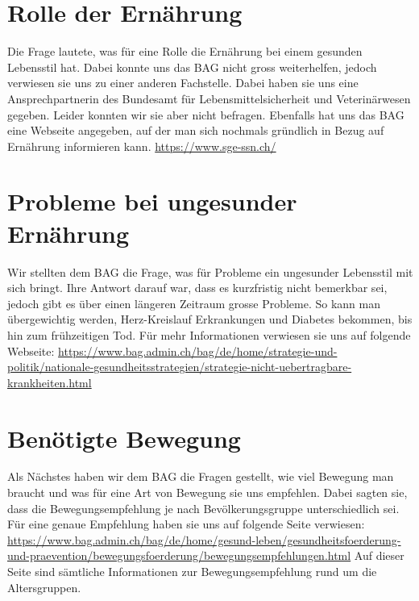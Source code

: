 \section{Rolle der Ernährung}
Die Frage lautete, was für eine Rolle die Ernährung bei einem gesunden Lebensstil hat. Dabei konnte uns das BAG nicht gross weiterhelfen, jedoch verwiesen sie uns zu einer anderen Fachstelle. Dabei haben sie uns eine Ansprechpartnerin des  Bundesamt für Lebensmittelsicherheit und Veterinärwesen gegeben. Leider konnten wir sie aber nicht befragen. Ebenfalls hat uns das BAG eine Webseite angegeben, auf der man sich nochmals gründlich in Bezug auf Ernährung informieren kann.
\newline
\url{https://www.sge-ssn.ch/}
\section{Probleme bei ungesunder Ernährung}
Wir stellten dem BAG die Frage, was für Probleme ein ungesunder Lebensstil mit sich bringt. Ihre Antwort darauf war, dass es kurzfristig nicht bemerkbar sei, jedoch gibt es über einen längeren Zeitraum grosse Probleme. So kann man übergewichtig werden, Herz-Kreislauf Erkrankungen und Diabetes bekommen, bis hin zum frühzeitigen Tod. Für mehr Informationen verwiesen sie uns auf folgende Webseite: 
\newline
\url{https://www.bag.admin.ch/bag/de/home/strategie-und-politik/nationale-gesundheitsstrategien/strategie-nicht-uebertragbare-krankheiten.html}
\section{Benötigte Bewegung}
Als Nächstes haben wir dem BAG die Fragen gestellt, wie viel Bewegung man braucht und was für eine Art von Bewegung sie uns empfehlen. Dabei sagten sie, dass die Bewegungsempfehlung je nach Bevölkerungsgruppe unterschiedlich sei. Für eine genaue Empfehlung haben sie uns auf folgende Seite verwiesen:
\newline
\url{https://www.bag.admin.ch/bag/de/home/gesund-leben/gesundheitsfoerderung-und-praevention/bewegungsfoerderung/bewegungsempfehlungen.html}
\newline
Auf dieser Seite sind sämtliche Informationen zur Bewegungsempfehlung rund um die Altersgruppen. 
